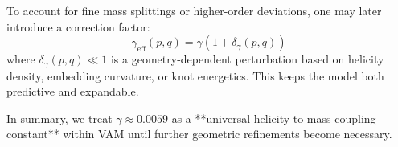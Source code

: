 \documentclass[11pt]{article}
\begin{document}
    To account for fine mass splittings or higher-order deviations, one may later introduce a correction factor:
    \[
        \gamma_{\text{eff}}(p,q) = \gamma \left( 1 + \delta_\gamma(p,q) \right)
    \]
    where \( \delta_\gamma(p,q) \ll 1 \) is a geometry-dependent perturbation based on helicity density, embedding curvature, or knot energetics. This keeps the model both predictive and expandable.

    In summary, we treat \( \gamma \approx 0.0059 \) as a **universal helicity-to-mass coupling constant** within VAM until further geometric refinements become necessary.
\end{document}
